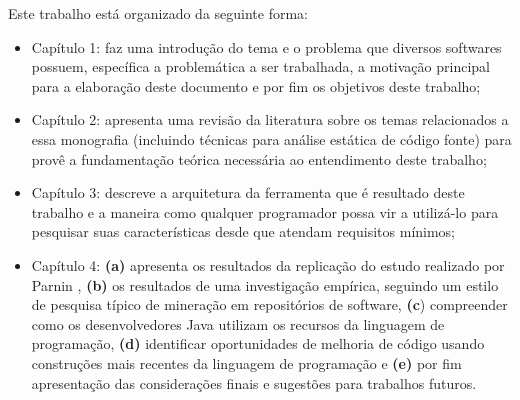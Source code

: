 Este trabalho está organizado da seguinte forma:
	\begin{itemize}
		\item Capítulo 1: faz uma introdução do tema e o problema que diversos softwares possuem, específica a problemática a ser trabalhada, a motivação principal para a elaboração deste documento e por fim os objetivos deste trabalho;
		
		\item Capítulo 2: apresenta uma revisão da literatura sobre os temas relacionados a essa monografia (incluindo técnicas para análise estática de código fonte) para provê a fundamentação teórica necessária ao entendimento deste trabalho;
		
		\item Capítulo 3: descreve a arquitetura da ferramenta que é resultado deste trabalho e a maneira como qualquer programador possa vir a utilizá-lo para pesquisar suas características desde que atendam requisitos mínimos;
		
		\item Capítulo 4: \textbf{(a)} apresenta os resultados da replicação do estudo realizado por Parnin \cite{Parnin:ACM2011}, \textbf{(b)} os resultados de uma investigação empírica, seguindo um estilo de pesquisa típico de mineração em 
		repositórios de software, \textbf{(c}) compreender como os desenvolvedores 
		Java utilizam os recursos da linguagem de programação, \textbf{(d)} identificar 
		oportunidades de melhoria de código usando construções mais 
		recentes da linguagem de programação e \textbf{(e)} por fim apresentação das considerações finais e sugestões para trabalhos futuros. 
	\end{itemize}



	
%	

